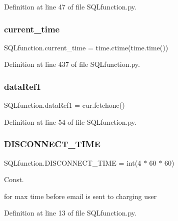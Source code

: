 Definition at line 47 of file S\+Q\+Lfunction.\+py.

\mbox{\label{namespace_s_q_lfunction_affebcb967a2b844a9e7542f181deacb6}} 
\subsubsection{current\+\_\+time}
{\footnotesize\ttfamily S\+Q\+Lfunction.\+current\+\_\+time = time.\+ctime(time.\+time())}



Definition at line 437 of file S\+Q\+Lfunction.\+py.

\mbox{\label{namespace_s_q_lfunction_aab5e54d1ed091926790df37c8098f1f7}} 
\subsubsection{data\+Ref1}
{\footnotesize\ttfamily S\+Q\+Lfunction.\+data\+Ref1 = cur.\+fetchone()}



Definition at line 54 of file S\+Q\+Lfunction.\+py.

\mbox{\label{namespace_s_q_lfunction_a68f53c3db854695a6e4a30a3a55594b4}} 
\subsubsection{D\+I\+S\+C\+O\+N\+N\+E\+C\+T\+\_\+\+T\+I\+ME}
{\footnotesize\ttfamily S\+Q\+Lfunction.\+D\+I\+S\+C\+O\+N\+N\+E\+C\+T\+\_\+\+T\+I\+ME = int(4 $\ast$ 60 $\ast$ 60)}



Const. 

for max time before email is sent to charging user 

Definition at line 13 of file S\+Q\+Lfunction.\+py.

\mbox{\label{namespace_s_q_lfunction_aef9c9d6f38d6ad20fa3572f211e29b04}} 
